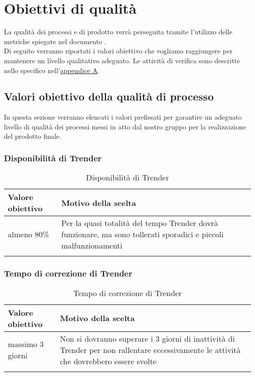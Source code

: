 \documentclass[../PianoDiQualifica_v3.0.0.tex]{subfiles}
\begin{document}
\section{Obiettivi di qualità}

	La qualità dei processi e di prodotto verrà perseguita tramite l'utilizzo delle metriche spiegate nel documento \normediprogettov.\\
	Di seguito verranno riportati i valori obiettivo che vogliamo raggiungere per mantenere un livello qualitativo adeguato.
	Le attività di verifica sono descritte nello specifico nell'\hyperref[sec:verifica]{\underline{appendice A}}.

	\subsection{Valori obiettivo della qualità di processo}
		In questa sezione verranno elencati i valori prefissati per garantire un adeguato livello di qualità dei processi messi in atto dal nostro gruppo per la realizzazione del prodotto finale.
		\subsubsection{Disponibilità di Trender}
			\begin{longtable}[c] { >{\centering\arraybackslash}p{4cm} p{7cm} }
				\toprule
				\centerline{\textbf{Valore obiettivo}} & \centerline{\textbf{Motivo della scelta}} \\
				\midrule
					almeno 80\% &	Per la quasi totalità del tempo Trender dovrà funzionare, ma sono tollerati sporadici e piccoli malfunzionamenti \\
				\bottomrule
				\caption{Disponibilità di Trender}
			\end{longtable}

		\subsubsection{Tempo di correzione di Trender}
			\begin{longtable}[c] { >{\centering\arraybackslash}p{4cm} p{7cm} }
				\toprule
				\centerline{\textbf{Valore obiettivo}} & \centerline{\textbf{Motivo della scelta}} \\
				\midrule
					massimo 3 giorni &	 Non si dovranno superare i 3 giorni di inattività di Trender per non rallentare eccessivamente le attività che dovrebbero essere svolte \\
				\bottomrule
				\caption{Tempo di correzione di Trender}
			\end{longtable}
\end{document}
